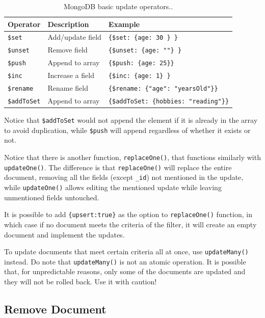 \begin{table}
	\centering \caption{MongoDB basic update operators..}\label{ch:db:tab:mongodbupdateoperator}
	\begin{tabularx}{\textwidth}{llX}
		\hline
		Operator & Description & Example \\ \hline
		\verb|$set| & Add/update field & \verb|{$set: {age: 30 } }| \\ 
		\verb|$unset| & Remove field & \verb|{$unset: {age: ""} }| \\ 
		\verb|$push| & Append to array & \verb|{$push: {age: 25}}| \\ 
		\verb|$inc| & Increase a field & \verb|{$inc: {age: 1} }| \\ 
		\verb|$rename| & Rename field &  \verb|{$rename: {"age": "yearsOld"}}| \\ 
		\verb|$addToSet| & Append to array & \verb|{$addToSet: {hobbies: "reading"}}| \\
		\hline
	\end{tabularx}
	\begin{flushleft}
		\footnotesize
		Notice that \verb|$addToSet| would not append the element if it is already in the array to avoid duplication, while \verb|$push| will append regardless of whether it exists or not.  
	\end{flushleft}
\end{table}

Notice that there is another function, \verb|replaceOne()|, that functions similarly with \verb|updateOne()|. The difference is that \verb|replaceOne()| will replace the entire document, removing all the fields (except \verb|_id|) not mentioned in the update, while \verb|updateOne()| allows editing the mentioned update while leaving unmentioned fields untouched.

It is possible to add \verb|{upsert:true}| as the option to \verb|replaceOne()| function, in which case if no document meets the criteria of the filter, it will create an empty document and implement the updates.

To update documents that meet certain criteria all at once, use \verb|updateMany()| instead. Do note that \verb|updateMany()| is not an atomic operation. It is possible that, for unpredictable reasons, only some of the documents are updated and they will not be rolled back. Use it with caution!

\subsection{Remove Document}

